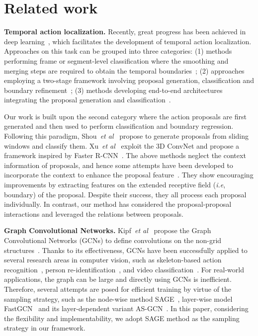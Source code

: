 \documentclass[10pt,twocolumn,letterpaper]{article}
\def\ie{\emph{i.e}\onedot} \def\Ie{\emph{I.e}\onedot}
\def\etal{\emph{et al}\onedot}
\begin{document}
	\section{Related work}\label{Sec:related}
	\noindent \textbf{Temporal action localization.} Recently, great progress has been achieved in deep learning~\cite{carreira2017quo,deng2018visual,guo2019auto,zhuang2018discrimination}, which facilitates the development of temporal action localization. Approaches on this task can be grouped into three categories: (1) methods performing frame or segment-level classification where the smoothing and merging steps are required to obtain the temporal boundaries~\cite{shou2017cdc,montes2016temporal,zeng2019breaking}; (2) approaches employing a two-stage framework involving proposal generation, classification and boundary refinement~\cite{shou2016temporal,xu2017r,zhao2017temporal}; (3) methods developing end-to-end architectures integrating the proposal generation and classification~\cite{yeung2016end,buch2017end,lin2017single}. 
	
	Our work is built upon the second category where the action proposals are first generated and then used to perform classification and boundary regression. Following this paradigm, Shou~\etal~\cite{shou2016temporal} propose to generate proposals from sliding windows and classify them.
	Xu~\etal~\cite{xu2017r} exploit the 3D ConvNet and propose a framework inspired by Faster R-CNN~\cite{ren2015faster}. The above methods neglect the context information of proposals, and hence some attempts have been developed to incorporate the context to enhance the proposal feature~\cite{dai2017temporal, gao2017turn, gao2017cascaded, zhao2017temporal, chao2018rethinking}. They show encouraging improvements by extracting features on the extended receptive field (\ie, boundary) of the proposal.
	Despite their success, they all process each proposal individually. In contrast, our method has considered the proposal-proposal interactions and leveraged the relations between proposals.
	
	\noindent \textbf{Graph Convolutional Networks.}
	Kipf~\etal~\cite{kipf2017semi} propose the Graph Convolutional Networks (GCNs) to define convolutions on the non-grid structures~\cite{tan2015learning}. Thanks to its effectiveness, GCNs have been successfully applied to several research areas in computer vision, such as skeleton-based action recognition~\cite{yan2018spatial}, person re-identification~\cite{shen2018person}, and video classification~\cite{wang2018video}. 
	For real-world applications, the graph can be large and directly using GCNs is inefficient. Therefore, several attempts are posed  for efficient training by virtue of the sampling strategy, such as the node-wise method SAGE~\cite{hamilton2017inductive}, layer-wise model FastGCN~\cite{chen2018fastgcn} and its layer-dependent variant AS-GCN~\cite{huang2018adaptive}. In this paper, considering the flexibility and implementability, we adopt SAGE method as the sampling strategy in our framework.
	
\end{document}
